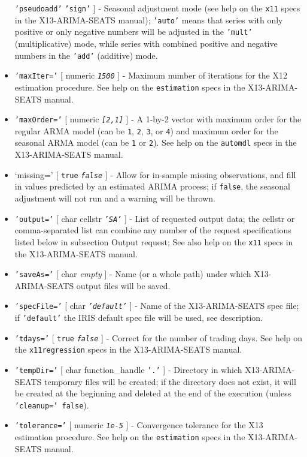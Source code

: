 \begin{itemize}
  \texttt{'pseudoadd'} \textbar{} \texttt{'sign'} {]} - Seasonal
  adjustment mode (see help on the \texttt{x11} specs in the
  X13-ARIMA-SEATS manual); \texttt{'auto'} means that series with only
  positive or only negative numbers will be adjusted in the
  \texttt{'mult'} (multiplicative) mode, while series with combined
  positive and negative numbers in the \texttt{'add'} (additive) mode.
\item
  \texttt{'maxIter='} {[} numeric \textbar{} \emph{\texttt{1500}} {]} -
  Maximum number of iterations for the X12 estimation procedure. See
  help on the \texttt{estimation} specs in the X13-ARIMA-SEATS manual.
\item
  \texttt{'maxOrder='} {[} numeric \textbar{} \emph{\texttt{{[}2,1{]}}}
  {]} - A 1-by-2 vector with maximum order for the regular ARMA model
  (can be \texttt{1}, \texttt{2}, \texttt{3}, or \texttt{4}) and maximum
  order for the seasonal ARMA model (can be \texttt{1} or \texttt{2}).
  See help on the \texttt{automdl} specs in the X13-ARIMA-SEATS manual.
\item
  `missing=' {[} \texttt{true} \textbar{} \emph{\texttt{false}} {]} -
  Allow for in-sample missing observations, and fill in values predicted
  by an estimated ARIMA process; if \texttt{false}, the seasonal
  adjustment will not run and a warning will be thrown.
\item
  \texttt{'output='} {[} char \textbar{} cellstr \textbar{}
  \emph{\texttt{'SA'}} {]} - List of requested output data; the cellstr
  or comma-separated list can combine any number of the request
  specifications listed below in subsection Output request; See also
  help on the \texttt{x11} specs in the X13-ARIMA-SEATS manual.
\item
  \texttt{'saveAs='} {[} char \textbar{} \emph{empty} {]} - Name (or a
  whole path) under which X13-ARIMA-SEATS output files will be saved.
\item
  \texttt{'specFile='} {[} char \textbar{} \emph{\texttt{'default'}} {]}
  - Name of the X13-ARIMA-SEATS spec file; if \texttt{'default'} the
  IRIS default spec file will be used, see description.
\item
  \texttt{'tdays='} {[} \texttt{true} \textbar{} \emph{\texttt{false}}
  {]} - Correct for the number of trading days. See help on the
  \texttt{x11regression} specs in the X13-ARIMA-SEATS manual.
\item
  \texttt{'tempDir='} {[} char \textbar{} function\_handle \textbar{}
  \texttt{'.'} {]} - Directory in which X13-ARIMA-SEATS temporary files
  will be created; if the directory does not exist, it will be created
  at the beginning and deleted at the end of the execution (unless
  \texttt{'cleanup=' false}).
\item
  \texttt{'tolerance='} {[} numeric \textbar{} \emph{\texttt{1e-5}} {]}
  - Convergence tolerance for the X13 estimation procedure. See help on
  the \texttt{estimation} specs in the X13-ARIMA-SEATS manual.
\end{itemize}

